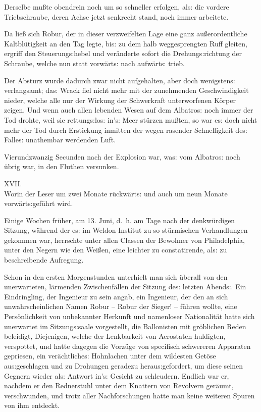 \documentclass[oneside,12pt]{book}
\newenvironment{antiqua}{\normalfont}{}
\newcommand{\s}{s:}
\begin{document}
Derselbe mu{\ss}te obendrein noch um so schneller erfolgen, al{\s}
die vordere Triebschraube, deren Achse jetzt senkrecht stand, noch
immer arbeitete.

Da lie{\ss} sich Robur, der in dieser verzweifelten Lage eine ganz
au{\ss}erordentliche Kaltbl\"utigkeit an den Tag legte, bi{\s} zu dem
halb weggesprengten Ruff gleiten, ergriff den Steuerung{\s}hebel und
ver\"anderte sofort die Drehung{\s}richtung der Schraube, welche nun
statt vorw\"art{\s} nach aufw\"art{\s} trieb.

Der Absturz wurde dadurch zwar nicht aufgehalten, aber doch
wenigsten{\s} verlangsamt; da{\s} Wrack fiel nicht mehr mit der
zunehmenden Geschwindigkeit nieder, welche alle nur der Wirkung der
Schwerkraft unterworfenen K\"orper zeigen. Und wenn auch allen
lebenden Wesen auf dem {\glqq}Albatro{\s}{\grqq} noch immer der Tod
drohte, weil sie rettung{\s}lo{\s} in'{\s} Meer st\"urzen mu{\ss}ten,
so war e{\s} doch nicht mehr der Tod durch Erstickung inmitten der
wegen rasender Schnelligkeit de{\s} Falle{\s} unathembar werdenden
Luft.

Vierundzwanzig Secunden nach der Explosion war, wa{\s} vom
{\glqq}Albatro{\s}{\grqq} noch \"ubrig war, in den Fluthen versunken.



\newpage\begin{center}\label{kap17}
{\large \begin{antiqua}XVII.\end{antiqua}\\
Worin der Leser um zwei Monate r\"uckw\"art{\s} und auch um neun
Monate vorw\"art{\s}gef\"uhrt wird.\\\bigskip}
\end{center}



Einige Wochen fr\"uher, am 13. Juni, d.~h. am Tage nach der
denkw\"urdigen Sitzung, w\"ahrend der e{\s} im Weldon-Institut zu so
st\"urmischen Verhandlungen gekommen war, herrschte unter allen
Classen der Bewohner von Philadelphia, unter den Negern wie den
Wei{\ss}en, eine leichter zu constatirende, al{\s} zu beschreibende
Aufregung.

Schon in den ersten Morgenstunden unterhielt man sich \"uberall von
den unerwarteten, l\"armenden Zwischenf\"allen der Sitzung de{\s}
letzten Abend{\s}. Ein Eindringling, der Ingenieur zu sein angab, ein
Ingenieur, der den an sich unwahrscheinlichen Namen Robur -- Robur
der Sieger! -- f\"uhren wollte, eine Pers\"onlichkeit von unbekannter
Herkunft und namenloser Nationalit\"at hatte sich unerwartet im
Sitzung{\s}saale vorgestellt, die Ballonisten mit gr\"oblichen Reden
beleidigt, Diejenigen, welche der Lenkbarkeit von Aerostaten
huldigten, verspottet, und hatte dagegen die Vorz\"uge von specifisch
schwereren Apparaten gepriesen, ein ver\"achtliche{\s} Hohnlachen
unter dem wildesten Get\"ose au{\s}geschlagen und zu Drohungen
geradezu herau{\s}gefordert, um diese seinen Gegnern wieder al{\s}
Antwort in'{\s} Gesicht zu schleudern. Endlich war er, nachdem er den
Rednerstuhl unter dem Knattern von Revolvern ger\"aumt, verschwunden,
und trotz aller Nachforschungen hatte man keine weiteren Spuren von
ihm entdeckt.
\end{document}
